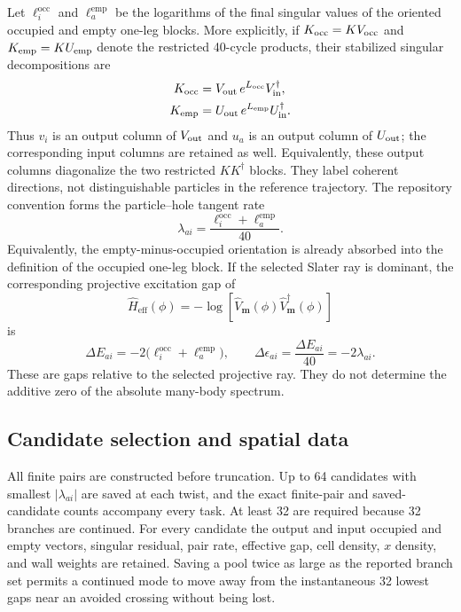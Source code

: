 \documentclass[aps,prb,twocolumn,floatfix,nofootinbib,superscriptaddress]{revtex4-2}
\begin{document}
Let $\ell_i^{\mathrm{occ}}$ and $\ell_a^{\mathrm{emp}}$ be the logarithms of
the final singular values of the oriented occupied and empty one-leg blocks.
More explicitly, if $K_{\rm occ}=KV_{\rm occ}$ and
$K_{\rm emp}=KU_{\rm emp}$ denote the restricted 40-cycle products, their
stabilized singular decompositions are
\begin{align}
 K_{\rm occ}&=V_{\rm out}\,e^{L_{\rm occ}}V_{\rm in}^\dagger,\\
 K_{\rm emp}&=U_{\rm out}\,e^{L_{\rm emp}}U_{\rm in}^\dagger.
 \label{eq:block-svd}
\end{align}
Thus $v_i$ is an output column of $V_{\rm out}$ and $u_a$ is an output
column of $U_{\rm out}$; the corresponding input columns are retained as
well.  Equivalently, these output columns diagonalize the two restricted
$KK^\dagger$ blocks.  They label coherent directions, not distinguishable
particles in the reference trajectory.
The repository convention forms the particle--hole tangent rate
\begin{equation}
 \lambda_{ai}
 =\frac{\ell_i^{\mathrm{occ}}+\ell_a^{\mathrm{emp}}}{40}.
 \label{eq:pair-rate}
\end{equation}
Equivalently, the empty-minus-occupied orientation is already absorbed into
the definition of the occupied one-leg block.  If the selected Slater ray is
dominant, the corresponding projective excitation gap of
\begin{equation}
 \hat H_{\mathrm{eff}}(\phi)
 =-\log\!\left[
 \hat V_{\boldsymbol m}(\phi)
 \hat V_{\boldsymbol m}^\dagger(\phi)
 \right]
\end{equation}
is
\begin{equation}
 \Delta E_{ai}=-2\bigl(
 \ell_i^{\mathrm{occ}}+\ell_a^{\mathrm{emp}}
 \bigr),\qquad
 \Delta\epsilon_{ai}=\frac{\Delta E_{ai}}{40}=-2\lambda_{ai}.
 \label{eq:effective-gap}
\end{equation}
These are gaps relative to the selected projective ray.  They do not determine
the additive zero of the absolute many-body spectrum.

\subsection{Candidate selection and spatial data}

All finite pairs are constructed before truncation.  Up to 64 candidates with
smallest $\lvert\lambda_{ai}\rvert$ are saved at each twist, and the exact
finite-pair and saved-candidate counts accompany every task.  At least 32 are
required because 32 branches are continued.  For every
candidate the output and input occupied and empty vectors, singular residual,
pair rate, effective gap, cell density, $x$ density, and wall weights are
retained.  Saving a pool twice as large as the reported branch set permits a
continued mode to move away from the instantaneous 32 lowest gaps near an
avoided crossing without being lost.
\end{document}
